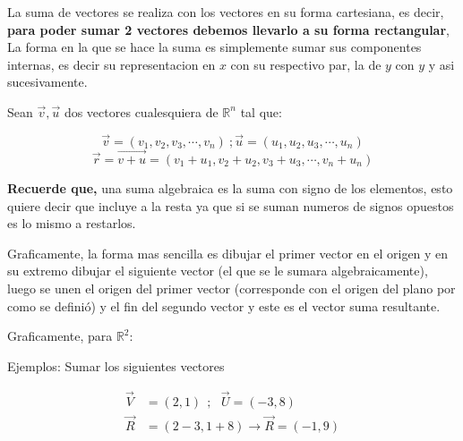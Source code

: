     La suma de vectores se realiza con los vectores en su forma cartesiana, es
    decir,\textbf{ para poder sumar 2 vectores debemos llevarlo a su forma
    rectangular}, La forma en la que se hace la suma es simplemente sumar sus
    componentes internas, es decir su representacion en $x$ con su respectivo
    par, la de $y$ con $y$ y asi sucesivamente.

    Sean $\vec{v},\vec{u}$ dos vectores cualesquiera de $\mathbb{R}^n$ tal que:

    $$\vec{v}=(v_1,v_2,v_3,\cdots,v_n)\ ; \vec{u}=(u_1,u_2,u_3,\cdots,u_n)$$
    $$\vec{r}=\vec{v+u}=(v_1+u_1,v_2+u_2,v_3+u_3,\cdots,v_n+u_n)$$

    \textbf{Recuerde que,} una suma algebraica es la suma con signo de los
    elementos, esto quiere decir que incluye a la resta ya que si se suman
    numeros de signos opuestos es lo mismo a restarlos.

    Graficamente, la forma mas sencilla es dibujar el primer vector en el
    origen y en su extremo dibujar el siguiente vector (el que se le sumara
    algebraicamente), luego se unen el origen del primer vector (corresponde
    con el origen del plano por como se definió) y el fin del segundo vector
    y este es el vector suma resultante.

    Graficamente, para $\mathbb{R}^2$:



    Ejemplos: Sumar los siguientes vectores

    \begin{align*}
        \vec{V}& =(2,1) \ \ ;\ \ \ \vec{U} =(-3,8)		\\
        \vec{R}&= (2-3 ,1+8 )   \rightarrow \vec{R} = (-1 ,9  )
    \end{align*}

